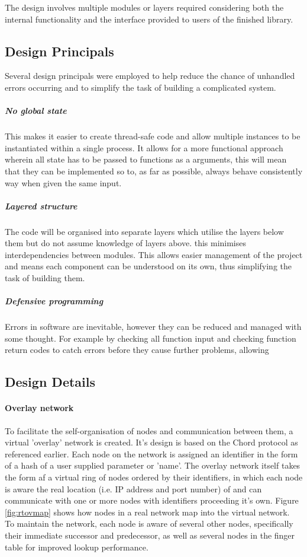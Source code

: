 \documentclass{article}
\begin{document}
The design involves multiple modules or layers
required considering both the internal functionality and the interface provided to users of the finished library.

\subsection{Design Principals}
Several design principals were employed to help reduce the chance of unhandled errors occurring and to simplify the task of building a complicated system.

\subparagraph{No global state}
This makes it easier to create thread-safe code and allow multiple instances to be instantiated within a single process. It allows for a more functional approach wherein all state has to be passed to functions as a arguments, this will mean that they can be implemented so to, as far as possible, always behave consistently way when given the same input.

\subparagraph{Layered structure}
The code will be organised into separate layers which utilise the layers below them but do not assume knowledge of layers above. this minimises interdependencies between modules.
This allows easier management of the project and means each component can be understood on its own, thus simplifying the task of building them.

\subparagraph{Defensive programming}
Errors in software are inevitable, however they can be reduced and managed with some thought. For example by checking all function input and checking function return codes to catch errors before they cause further problems, allowing

\subsection{Design Details}

\paragraph{Overlay network}
To facilitate the self-organisation of nodes and communication between them, a virtual 'overlay' network is created. It's design is based on the Chord protocol as referenced earlier. Each node on the network is assigned an identifier in the form of a hash of a user supplied parameter or 'name'. The overlay network itself takes the form af a virtual ring of nodes ordered by their identifiers, in which each node is aware the real location (i.e. IP address and port number) of and can communicate with one or more nodes with identifiers proceeding it's own. Figure \ref{fig:rtovmap} shows how nodes in a real network map into the virtual network.
\\
To maintain the network, each node is aware of several other nodes, specifically their immediate successor and predecessor, as well as several nodes in the finger table for improved lookup performance.
\end{document}
